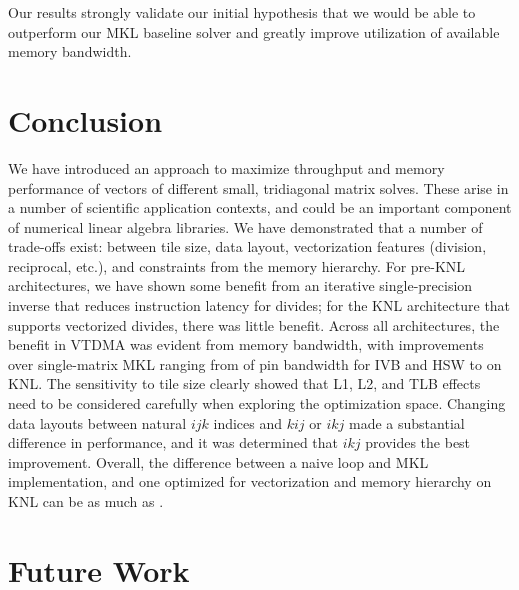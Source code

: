 \documentclass{sig-alternate-05-2015}
\begin{document}
Our results strongly validate our initial hypothesis that we would be able to
  outperform our MKL baseline solver and greatly improve utilization of available
  memory bandwidth.

\section{Conclusion}
\label{sec:conclusion}

We have introduced an approach to maximize throughput and memory
  performance of vectors of different small, tridiagonal matrix solves.
These arise in a number of scientific application contexts, and could
  be an important component of numerical linear algebra libraries.
We have demonstrated that a number of trade-offs exist: between tile size,
  data layout, vectorization features (division, reciprocal, etc.),
  and constraints from the memory hierarchy.
For pre-KNL architectures, we have shown some benefit from an iterative
  single-precision inverse that reduces instruction latency for divides; 
  for the KNL architecture that supports vectorized divides, 
  there was little benefit.
Across all architectures, the benefit in VTDMA was evident from 
  memory bandwidth, with improvements over single-matrix MKL ranging 
  from  of pin bandwidth for IVB and HSW to 
   on KNL.
The sensitivity to tile size clearly showed that L1, L2, and TLB effects
  need to be considered carefully when exploring the optimization space.
Changing data layouts between natural \(ijk\) indices and \(kij\) 
  or \(ikj\) made a substantial difference in performance, 
  and it was determined that \(ikj\) provides the best 
   improvement.
Overall, the difference between a naive loop and MKL implementation,
  and one optimized for vectorization and memory hierarchy on KNL 
  can be as much as .

\section{Future Work}
\label{sec:future_work}
\end{document}
